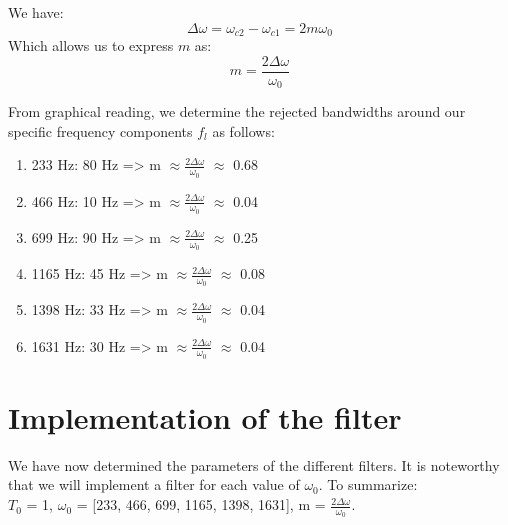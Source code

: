 We have:
$$\Delta\omega = \omega_{c2} - \omega_{c1} = 2m\omega_{0}$$
Which allows us to express $m$ as:
\textbf{$$m = \frac{2\Delta\omega}{\omega_{0}}$$}

From graphical reading, we determine the rejected bandwidths around our specific frequency components $f_l$ as follows:
\begin{enumerate}
    \item 233 Hz: 80 Hz => m $\approx \frac{2\Delta\omega}{\omega_{0}}$ $\approx$ 0.68
    \item 466 Hz: 10 Hz => m $\approx \frac{2\Delta\omega}{\omega_{0}}$ $\approx$ 0.04
    \item 699 Hz: 90 Hz => m $\approx \frac{2\Delta\omega}{\omega_{0}}$ $\approx$ 0.25
    \item 1165 Hz: 45 Hz => m $\approx \frac{2\Delta\omega}{\omega_{0}}$ $\approx$ 0.08
    \item 1398 Hz: 33 Hz => m $\approx \frac{2\Delta\omega}{\omega_{0}}$ $\approx$ 0.04
    \item 1631 Hz: 30 Hz => m $\approx \frac{2\Delta\omega}{\omega_{0}}$ $\approx$ 0.04
\end{enumerate}

\newpage
\section{Implementation of the filter}
We have now determined the parameters of the different filters. It is noteworthy that we will implement a filter for each value of $\omega_0$.
To summarize: \\
$T_0$ = 1, $\omega_0$ = [233, 466, 699, 1165, 1398, 1631], m = $\frac{2\Delta\omega}{\omega_{0}}$.

